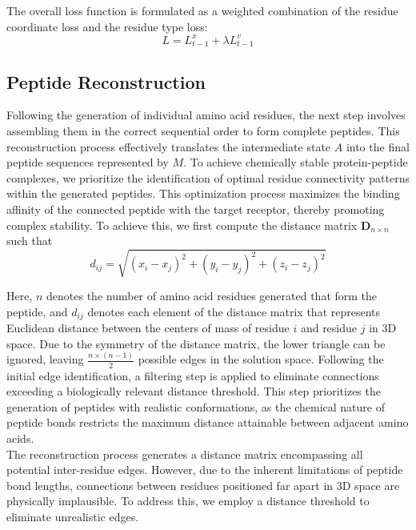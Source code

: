 The overall loss function is formulated as a weighted combination of the residue coordinate loss and the residue type loss:
$$L = L_{t-1}^x + \lambda L_{t-1}^v$$

\subsection{Peptide Reconstruction}

Following the generation of individual amino acid residues, the next step involves assembling them in the correct sequential order to form complete peptides. This reconstruction process effectively translates the intermediate state $A$ into the final peptide sequences represented by $M$. To achieve chemically stable protein-peptide complexes, we prioritize the identification of optimal residue connectivity patterns within the generated peptides. This optimization process maximizes the binding affinity of the connected peptide with the target receptor, thereby promoting complex stability. To achieve this, we first compute the distance matrix $\mathbf{D}_{n \times n}$ such that
$$d_{ij} = \sqrt{(x_i - x_j)^2 + (y_i - y_j)^2 + (z_i - z_j)^2}$$

Here, $n$ denotes the number of amino acid residues generated that form the peptide, and $d_{ij}$ denotes each element of the distance matrix that represents Euclidean distance between the centers of mass of residue $i$ and residue $j$ in 3D space. Due to the symmetry of the distance matrix, the lower triangle can be ignored, leaving $\frac{n \times (n-1)}{2}$ possible edges in the solution space. Following the initial edge identification, a filtering step is applied to eliminate connections exceeding a biologically relevant distance threshold. This step prioritizes the generation of peptides with realistic conformations, as the chemical nature of peptide bonds restricts the maximum distance attainable between adjacent amino acids. \\
The reconstruction process generates a distance matrix encompassing all potential inter-residue edges. However, due to the inherent limitations of peptide bond lengths, connections between residues positioned far apart in 3D space are physically implausible. To address this, we employ a distance threshold to eliminate unrealistic edges. \\

